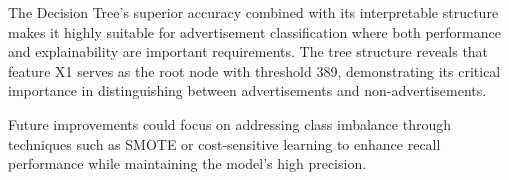 The Decision Tree's superior accuracy combined with its interpretable structure makes it highly suitable for advertisement classification where both performance and explainability are important requirements. The tree structure reveals that feature X1 serves as the root node with threshold 389, demonstrating its critical importance in distinguishing between advertisements and non-advertisements.

Future improvements could focus on addressing class imbalance through techniques such as SMOTE or cost-sensitive learning to enhance recall performance while maintaining the model's high precision.